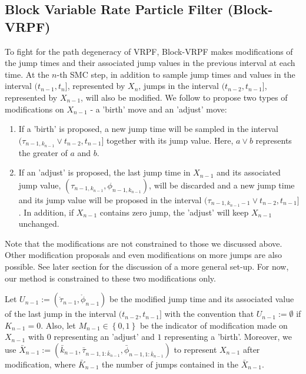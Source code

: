 \documentclass[12pt,a4paper]{article}
\begin{document}
\subsection{Block Variable Rate Particle Filter (Block-VRPF)}
To fight for the path degeneracy of VRPF, Block-VRPF makes modifications of the jump times and their associated jump values in the previous interval at each time. At the $n$-th SMC step, in addition to sample jump times and values in the interval $(t_{n-1},t_n]$, represented by $X_n$, jumps in the interval $(t_{n-2},t_{n-1}]$, represented by $X_{n-1}$, will also be modified. We follow \cite{whiteley2011monte} to propose two types of modifications on $X_{n-1}$ - a 'birth' move and an 'adjust' move:
\begin{enumerate}
    \item If a 'birth' is proposed, a new jump time will be sampled in the interval $(\tau_{n-1,k_{n-1}}\vee t_{n-2},t_{n-1}]$ together with its jump value. Here, $a \vee b$ represents the greater of $a$ and $b$. 
    \item If an 'adjust' is proposed, the last jump time in $X_{n-1}$ and its associated jump value, $\left(\tau_{n-1,k_{n-1}},\phi_{n-1,k_{n-1}}\right)$, will be discarded and a new jump time and its jump value will be proposed in the interval $(\tau_{n-1,k_{n-1}-1} \vee t_{n-2},t_{n-1}]$. In addition, if $X_{n-1}$ contains zero jump, the 'adjust' will keep $X_{n-1}$ unchanged. 
\end{enumerate}

Note that the modifications are not constrained to those we discussed above. Other modification proposals and even modifications on more jumps are also possible. See later section for the discussion of a more general set-up. For now, our method is constrained to these two modifications only. 

Let $U_{n-1} := \left(\mathring{\tau}_{n-1},\mathring{\phi}_{n-1}\right)$ be the modified jump time and its associated value of the last jump in the interval $(t_{n-2},t_{n-1}]$ with the convention that $U_{n-1} := \emptyset$ if $K_{n-1} = 0$. Also, let $M_{n-1} \in \left\{0,1\right\}$ be the indicator of modification made on $X_{n-1}$ with $0$ representing an 'adjust' and $1$ representing a 'birth'. Moreover, we use $\bar{X}_{n-1}:=\left(\bar{k}_{n-1},\bar{\tau}_{n-1,1:\bar{k}_{n-1}},\bar{\phi}_{n-1,1:\bar{k}_{n-1}}\right)$ to represent $X_{n-1}$ after modification, where $\bar{K}_{n-1}$ the number of jumps contained in the $\bar{X}_{n-1}$. 
\end{document}
